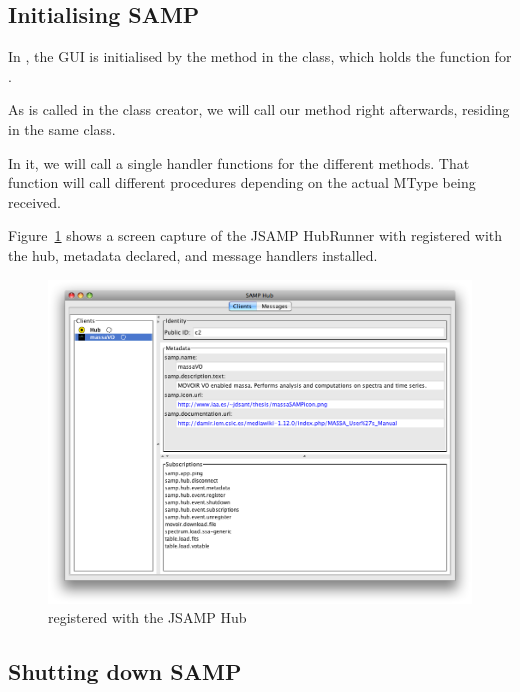 		\subsection{Initialising SAMP} %
		\label{sub:initialising_samp_in_massa}
			
			In \massa{}, the GUI is initialised by the
			 method in the 
			class, which holds the  function for
			\massa{}.
			
			 As  is called in the
			 class creator, we will call our
			\initSamp{} method right afterwards, residing in the
			same  class.
			
			 In it, we will call a single handler functions for the
			different  methods. That function will
			call different procedures depending on the actual MType
			being received.
			
			 Figure~\ref{fig:fig_massaVOinHub} shows a screen
			capture of the JSAMP HubRunner with \massa{} registered
			with the hub, metadata declared, and message handlers
			installed.
			
			\begin{figure}[tbp]
				\centering
					\includegraphics[height=0.4\textheight]
					{fig/massaVOinHub.png}
				\caption{\massa{} registered with the JSAMP Hub}
				\label{fig:fig_massaVOinHub}
			\end{figure}
			
		
		\subsection{Shutting down SAMP} %
		\label{sub:include_samp_shutdown}
			
